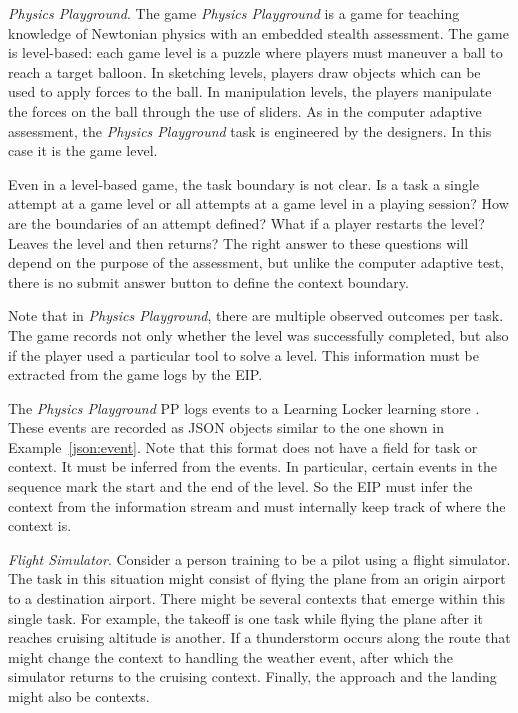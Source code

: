 \documentclass{article}
\begin{document}
  \noindent\textit{Physics Playground}.  The game \textit{Physics
    Playground} \cite{ShuteVentura2013,KimPhysicsPlayground} is a
  game for teaching knowledge of Newtonian physics with an embedded
  stealth assessment.  The game is level-based: each game level
  is a puzzle where players must maneuver a ball to reach a target
  balloon.  In sketching levels, players draw objects which can be
  used to apply forces to the ball.  In manipulation levels, the
  players manipulate the forces on the ball through the use of
  sliders. As in the computer adaptive assessment, the
  \textit{Physics Playground} task is engineered by the designers.  In
  this case it is the game level.

  Even in a level-based game, the task boundary is not clear.  Is a
  task a single attempt at a game level or all attempts at a game
  level in a playing session?  How are the boundaries of an attempt
  defined?  What if a player restarts the level?  Leaves the level and
  then returns?  The right answer to these questions will depend on
  the purpose of the assessment, but unlike the computer adaptive
  test, there is no submit answer button to define the context
  boundary.

  Note that in \textit{Physics Playground}, there are multiple
  observed outcomes per task.  The game records not only whether the
  level was successfully completed, but also if the player used a
  particular tool to solve a level.  This information must be
  extracted from the game logs by the EIP.

  The \textit{Physics Playground} PP logs events to a Learning Locker
  learning store \cite{LearningLocker}.  These events are recorded as
  JSON objects similar to the one shown in Example~\ref{json:event}.
  Note that this format does not have a field for task or context.  It
  must be inferred from the events.  In particular, certain events in
  the sequence mark the start and the end of the level.  So the EIP
  must infer the context from the information stream and must
  internally keep track of where the context is.

  \noindent\textit{Flight Simulator}.  Consider a person training to
  be a pilot using a flight simulator.  The task in this situation
  might consist of flying the plane from an origin airport to a
  destination airport.  There might be several contexts that emerge
  within this single task.  For example, the takeoff is one task while
  flying the plane after it reaches cruising altitude is another.  If
  a thunderstorm occurs along the route that might change the context
  to handling the weather event, after which the simulator returns to
  the cruising context.  Finally, the approach and the landing might
  also be contexts.
\end{document}
